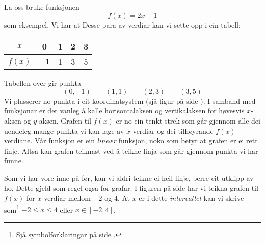 La oss bruke funksjonen 
\[ f(x)=2x-1 \]
som eksempel. Vi har at
Desse para av verdiar kan vi sette opp i ein tabell:
	\begin{center}
	\begin{tabular}{c | c |c |c|c}
		$ x $ & 0 & 1 & 2 & 3 \\ \hline
		$ f(x) $ &$  -1 $ & 1&3 &5
	\end{tabular}
\end{center}
Tabellen over gir punkta
\[ (0, -1)\quad\quad(1, 1)\quad\quad(2, 3)\quad\quad(3, 5) \]
Vi plasserer no punkta i eit koordinatsystem (sjå figur på side \pageref{funkfig}). I samband med funksjonar er det vanleg å kalle horisontalaksen og vertikalaksen for høvesvis $ x $-aksen og $ y $-aksen. 
Grafen til $ f(x) $ er no ein tenkt strek som går gjennom alle dei uendeleg mange punkta vi kan lage av $ x$-verdiar og dei tilhøyrande $ f(x) $-verdiane. Vår funksjon er ein \textit{lineær} funksjon, noko som betyr at grafen er ei rett linje. Altså kan grafen teiknast ved å teikne linja som går gjennom punkta vi har funne.\vsk

Som vi har vore inne på før, kan vi aldri teikne ei heil linje, berre eit utklipp av ho. Dette gjeld som regel også for grafar. I figuren på side \pageref{funkfig} har vi teikna grafen til $ f(x) $ for $ x $-verdiar mellom $ -2 $ og $ 4 $. At $ x $ er i dette \textit{intervallet} kan vi skrive som\footnote{Sjå symbolforklaringar på side \pageref{Symbol}.} $ -2\leq x\leq 4 $ eller $ x\in[-2, 4] $.
 \label{funkfig}

